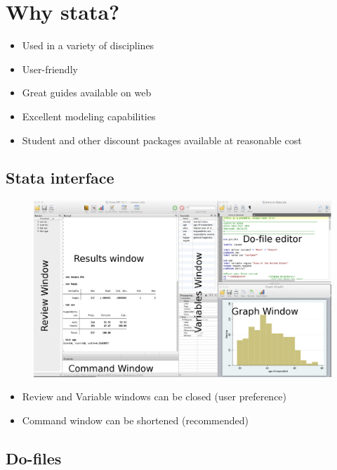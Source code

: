 \documentclass[]{book}
\providecommand{\tightlist}{%
  \setlength{\itemsep}{0pt}\setlength{\parskip}{0pt}}
\begin{document}
\section{Why stata?}\label{why-stata}

\begin{itemize}
\tightlist
\item
  Used in a variety of disciplines
\item
  User-friendly
\item
  Great guides available on web
\item
  Excellent modeling capabilities
\item
  Student and other discount packages available at reasonable cost
\end{itemize}

\subsection{Stata interface}\label{stata-interface}

\begin{figure}
\centering
\includegraphics{Stata/StataIntro/images/StataInterface.png}
\caption{}
\end{figure}

\begin{itemize}
\tightlist
\item
  Review and Variable windows can be closed (user preference)
\item
  Command window can be shortened (recommended)
\end{itemize}

\subsection{Do-files}\label{do-files}
\end{document}
